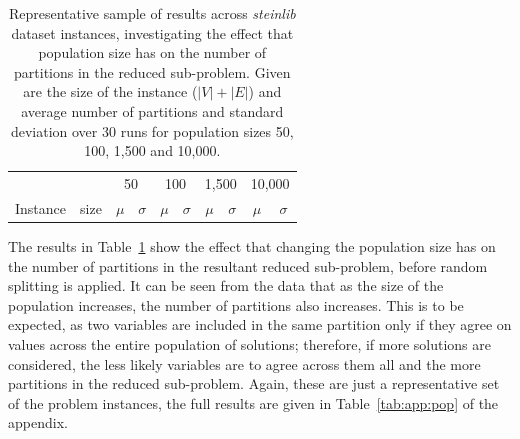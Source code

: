 \documentclass[journal]{IEEEtran}
\begin{document}
\begin{table}[t!]
\centering
\caption[Size of reduced sub-problem results]{Representative sample of results across \emph{steinlib} dataset instances, investigating the effect that population size has on the number of partitions in the reduced sub-problem. Given are the size of the instance (\(|V|+|E|\)) and average number of partitions and standard deviation over 30 runs for population sizes 50, 100, 1,500 and 10,000.}\label{tab:stpg:pop:trunc} 
\begin{adjustbox}{width=0.45\textwidth}
\begin{tabular}{lrrrrrrrrr} \toprule
 &  & \multicolumn{2}{c}{50} & \multicolumn{2}{c}{100} & \multicolumn{2}{c}{1,500} & \multicolumn{2}{c}{10,000}\\
\cmidrule(lr){3-4} \cmidrule(lr){5-6} \cmidrule(lr){7-8} \cmidrule(lr){9-10} 
Instance & size & \multicolumn{1}{c}{\(\mu\)}&\multicolumn{1}{c}{\(\sigma\)} & \multicolumn{1}{c}{\(\mu\)}&\multicolumn{1}{c}{\(\sigma\)}& \multicolumn{1}{c}{\(\mu\)}&\multicolumn{1}{c}{\(\sigma\)} & \multicolumn{1}{c}{\(\mu\)}&\multicolumn{1}{c}{\(\sigma\)}\\ \midrule
%

%
\bottomrule
\end{tabular}
\end{adjustbox}
\end{table}

The results in Table~\ref{tab:stpg:pop:trunc} show the effect that changing the population size has on the number of partitions in the resultant reduced sub-problem, before random splitting is applied. It can be seen from the data that as the size of the population increases, the number of partitions also increases. This is to be expected, as two variables are included in the same partition only if they agree on values across the entire population of solutions; therefore, if more solutions are considered, the less likely variables are to agree across them all and the more partitions in the reduced sub-problem. Again, these are just a representative set of the problem instances, the full results are given in Table~\ref{tab:app:pop} of the appendix.
\end{document}
